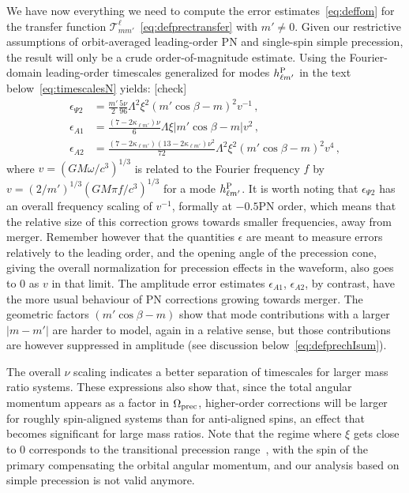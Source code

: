 \documentclass[aps,showpacs,twocolumn,
prd,superscriptaddress,nofootinbib]{revtex4-1}
\newcommand\calT{{\mathcal{T}}}
\newcommand{\SM}[1]{{\color{Red} #1}}
\newcommand{\jgb}[1]{{\color{DarkGreen} #1}}
\begin{document}
We have now everything we need to compute the error estimates~\eqref{eq:deffom} for the transfer function $\calT^{\ell}_{mm'}$~\eqref{eq:defprectransfer} with $m' \neq 0$. Given our restrictive  assumptions of orbit-averaged leading-order PN and single-spin simple precession, the result will only be a crude order-of-magnitude estimate. Using the Fourier-domain leading-order timescales generalized for modes $h^{\rm P}_{\ell m'}$ in the text below~\eqref{eq:timescalesN} yields: \SM{[check]}
\begin{subequations}\label{eq:precfomPN}
\begin{align}
	\epsilon_{\Psi 2} &= \frac{m'}{2} \frac{5\nu}{96} \Lambda^{2} \xi^{2} (m' \cos\beta - m)^{2} v^{-1} \,, \\
	\epsilon_{A 1} &=  \frac{(7 - 2\kappa_{\ell m'})\nu}{6} \Lambda \xi |m' \cos\beta - m| v^{2} \,, \\
	\epsilon_{A 2} &= \frac{(7 - 2\kappa_{\ell m'}) (13 - 2\kappa_{\ell m'}) \nu^{2}}{72} \Lambda^{2} \xi^{2} (m' \cos\beta - m)^{2} v^{4} \,,
\end{align}
\end{subequations}
where $v = (G M \omega/c^{3})^{1/3}$ is related to the Fourier frequency $f$ by $v = (2/m')^{1/3} (GM \pi f/c^{3})^{1/3}$ for a mode $h^{\rm P}_{\ell m'}$. It is worth noting that $\epsilon_{\Psi 2}$ has an overall frequency scaling of $v^{-1}$, formally at $-0.5$PN order, which means that the relative size of this correction grows towards smaller frequencies, away from merger. Remember however that the quantities $\epsilon$ are meant to measure errors relatively to the leading order, and the opening angle of the precession cone, giving the overall normalization for precession effects in the waveform, also goes to 0 as $v$ in that limit. The amplitude error estimates $\epsilon_{A1}$, $\epsilon_{A2}$, by contrast, have the more usual behaviour of PN corrections growing towards merger. The geometric factors $(m' \cos\beta - m)$ show that mode contributions with a larger $|m-m'|$ are harder to model, again in a relative sense, but those contributions are however suppressed in amplitude (see discussion below~\eqref{eq:defprechIsum}).

The overall $\nu$ scaling indicates a better separation of timescales for larger mass ratio systems. These expressions also show that, since the total angular momentum appears as a factor in $\Omega_{\rm prec}$, higher-order corrections will be larger for \jgb{roughly} spin-aligned systems than for anti-aligned spins, an effect that becomes significant for large mass ratios. Note that the regime where $\xi$ gets close to 0 corresponds to the transitional precession range~\cite{Apostolatos+94}, with the spin of the primary compensating the orbital angular momentum, and our analysis based on simple precession is not valid anymore.
\end{document}
